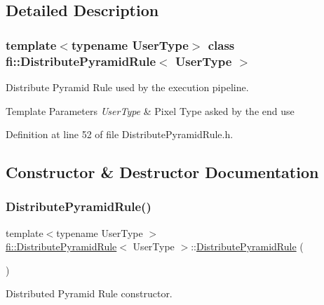 \subsection{Detailed Description}
\subsubsection*{template$<$typename User\+Type$>$\newline
class fi\+::\+Distribute\+Pyramid\+Rule$<$ User\+Type $>$}

Distribute Pyramid Rule used by the execution pipeline. 


\begin{DoxyTemplParams}{Template Parameters}
{\em User\+Type} & Pixel Type asked by the end use \\
\hline
\end{DoxyTemplParams}


Definition at line 52 of file Distribute\+Pyramid\+Rule.\+h.



\subsection{Constructor \& Destructor Documentation}
\mbox{\label{classfi_1_1DistributePyramidRule_a09c7e16ed7613f437eb6c0ae5a40c426}} 
\subsubsection{\texorpdfstring{Distribute\+Pyramid\+Rule()}{DistributePyramidRule()}}
{\footnotesize\ttfamily template$<$typename User\+Type $>$ \\
\hyperlink{classfi_1_1DistributePyramidRule}{fi\+::\+Distribute\+Pyramid\+Rule}$<$ User\+Type $>$\+::\hyperlink{classfi_1_1DistributePyramidRule}{Distribute\+Pyramid\+Rule} (\begin{DoxyParamCaption}{ }\end{DoxyParamCaption})\hspace{0.3cm}{\ttfamily [inline]}}



Distributed Pyramid Rule constructor. 



